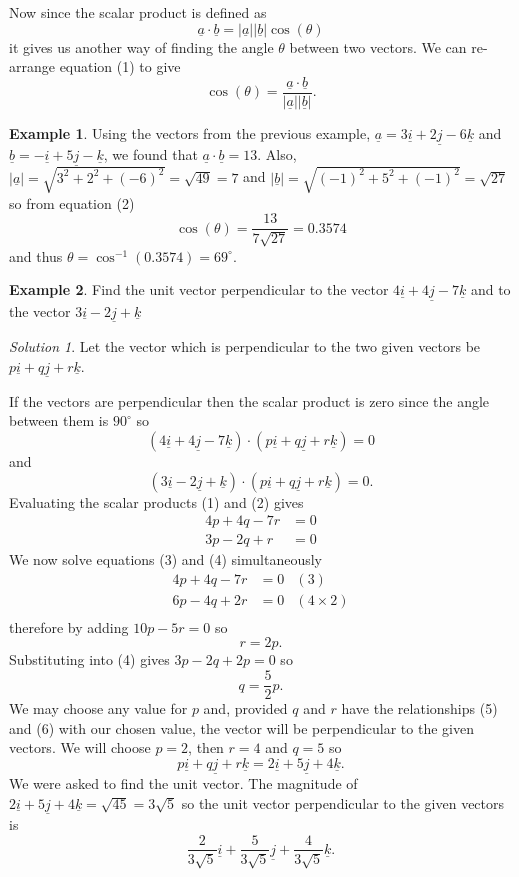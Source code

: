 \documentclass[
  11pt,
  oneside]{book}
\newcommand{\slide}{}
\theoremstyle{definition}
\theoremstyle{definition}
\newtheorem{example}{Example}[chapter]
\theoremstyle{definition}
\theoremstyle{definition}
\theoremstyle{remark}
\newtheorem*{solution}{Solution}
\begin{document}
Now since the scalar product is defined as
\[
\underline a \cdot\underline b = |\underline a||\underline b| \cos(\theta)\tag{1}
\]
it gives us another way of finding the angle \(\theta\) between two vectors. We can re-arrange equation (1) to give
\[
\cos(\theta) = \frac{\underline a\cdot\underline b}{|\underline a||\underline b|}.\tag{2}
\]
\slide

\begin{example}
Using the vectors from the previous example, \(\underline a = 3\underline i + 2\underline j - 6\underline k\) and \(\underline b = -\underline i + 5\underline j - \underline k\), we found that \(\underline a\cdot\underline b = 13\).
Also, \(|\underline a| = \sqrt{3^2+2^2+(-6)^2}=\sqrt{49}=7\) and \(|\underline b| = \sqrt{(-1)^2+5^2+(-1)^2} = \sqrt{27}\) so from equation (2)
\[
\cos(\theta) = \frac{13}{7\sqrt{27}} = 0.3574
\]
and thus \(\theta = \cos^{-1}(0.3574) = 69^\circ\).
\end{example}

\slide

\begin{example}
Find the unit vector perpendicular to the vector \(4\underline i+4\underline j-7\underline k\) and to the vector \(3\underline i - 2\underline j+\underline k\)
\end{example}

\begin{solution}
Let the vector which is perpendicular to the two given vectors be \(p\underline i + q\underline j + r\underline k\).

If the vectors are perpendicular then the scalar product is zero since the angle between them is \(90^\circ\) so
\[
(4\underline i + 4\underline j - 7\underline k) \cdot (p\underline i + q\underline j + r\underline k) = 0\tag{1}
\]
and
\[
(3\underline i - 2\underline j + \underline k) \cdot (p\underline i + q\underline j + r\underline k) = 0.\tag{2}
\]
Evaluating the scalar products (1) and (2) gives
\begin{align*}
4p + 4q -7r& = 0\tag{3}\\
3p - 2q + r& = 0\tag{4}
\end{align*}
We now solve equations (3) and (4) simultaneously
\begin{align*}
4p + 4q - 7r& = 0&(3)\\
6p - 4q + 2r& = 0 &(4 \times 2)\\
\end{align*}
therefore by adding \(10p - 5r = 0\) so
\[
r = 2p.\tag{5}
\]
Substituting into (4) gives \(3p - 2q + 2p = 0\) so
\[
q = \frac52p.\tag{6}
\]
We may choose any value for \(p\) and, provided \(q\) and \(r\) have the relationships (5) and (6) with our chosen value, the vector will be perpendicular to the given vectors. We will choose \(p = 2\), then \(r= 4\) and \(q = 5\) so
\[
p\underline i + q\underline j + r\underline k = 2\underline i + 5\underline j + 4\underline k.
\]
We were asked to find the unit vector. The magnitude of \(2\underline i + 5\underline j + 4\underline k = \sqrt{45} = 3\sqrt{5}\) so the unit vector perpendicular to the given vectors is
\[
\frac{2}{3\sqrt{5}}\underline i+\frac{5}{3\sqrt{5}}\underline j+\frac{4}{3\sqrt{5}}\underline k.
\]
\end{solution}
\end{document}
